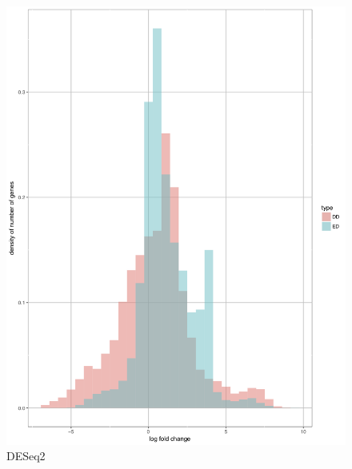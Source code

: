 \documentclass[11pt]{amsart}
\begin{document}
\begin{figure}[H]
  \includegraphics[width=\linewidth]{G74596_des.png}
  \caption{DESeq2}\label{fig:DESeq2}
\endminipage
\end{figure}



\cleardoublepage


\end{document}
